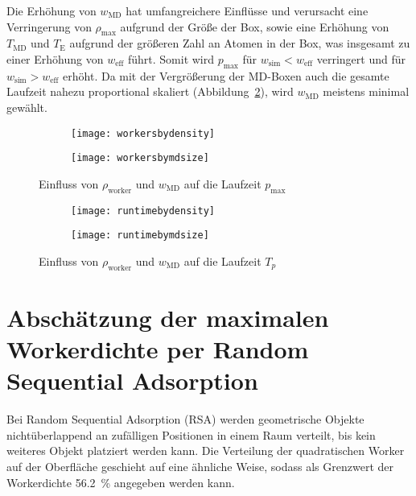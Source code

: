 Die Erhöhung von $w_\text{MD}$ hat umfangreichere Einflüsse und verursacht eine Verringerung von $\rho_\text{max}$ aufgrund der Größe der Box, sowie eine Erhöhung von $T_\text{MD}$ und $T_\text{E}$ aufgrund der größeren Zahl an Atomen in der Box, was insgesamt zu einer Erhöhung von $w_\text{eff}$ führt.
Somit wird $p_\text{max}$ für $w_\text{sim} < w_\text{eff}$ verringert und für $w_\text{sim} > w_\text{eff}$ erhöht.
Da mit der Vergrößerung der MD-Boxen auch die gesamte Laufzeit nahezu proportional skaliert (Abbildung~\ref{fig:tpother}), wird $w_\text{MD}$ meistens minimal gewählt.

\begin{figure}[p]

  \captionsetup[subfigure]{singlelinecheck=false}
  \def\subfigwidth{7cm}
  \begin{subfigure}[t]{\subfigwidth}
    \texttt{[image: workersbydensity]}
  \end{subfigure}
  \hfill
  \begin{subfigure}[t]{\subfigwidth}
    \texttt{[image: workersbymdsize]}
  \end{subfigure}

  \caption{Einfluss von $\rho_\text{worker}$ und $w_\text{MD}$ auf die Laufzeit $p_\text{max}$}
  \label{fig:pmaxother}

\end{figure}

\begin{figure}[p]

  \captionsetup[subfigure]{singlelinecheck=false}
  \def\subfigwidth{7cm}
  \begin{subfigure}[t]{\subfigwidth}
    \texttt{[image: runtimebydensity]}
  \end{subfigure}
  \hfill
  \begin{subfigure}[t]{\subfigwidth}
    \texttt{[image: runtimebymdsize]}
  \end{subfigure}

  \caption{Einfluss von $\rho_\text{worker}$ und $w_\text{MD}$ auf die Laufzeit $T_p$}
  \label{fig:tpother}

\end{figure}

\clearpage

\section{Abschätzung der maximalen Workerdichte per Random Sequential Adsorption}
Bei Random Sequential Adsorption (RSA) werden geometrische Objekte nichtüberlappend an zufälligen Positionen in einem Raum verteilt, bis kein weiteres Objekt platziert werden kann.
Die Verteilung der quadratischen Worker auf der Oberfläche geschieht auf eine ähnliche Weise, sodass als Grenzwert der Workerdichte \SI{56.2}{\percent}\cite{brosilow_random_1991} angegeben werden kann.

